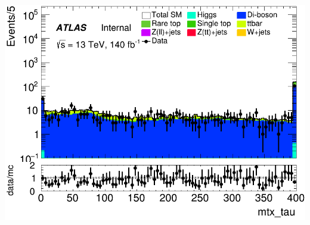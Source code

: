 \documentclass[usenames,dvipsnames]{beamer}
\begin{document}
\begin{frame}
\begin{minipage}{0.32\textwidth}
        \includegraphics[width=\textwidth]{graphics/LLL_met/LLL_met_mtx_tau.png}
    \end{minipage}
\end{frame}
\end{document}
